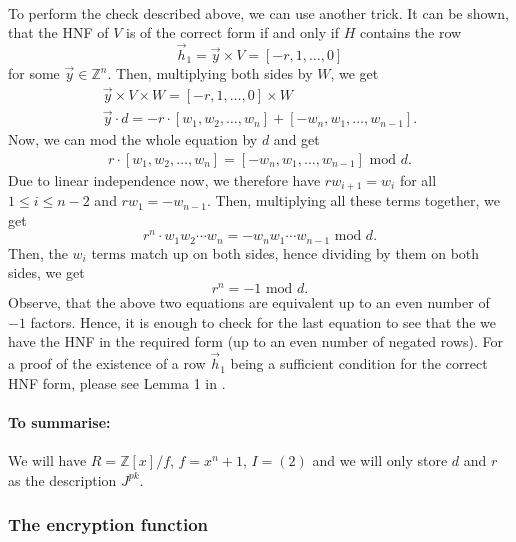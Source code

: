 \documentclass{article}
\theoremstyle{definition}
\theoremstyle{example}
\newcommand{\Int}{\mathbb{Z}}
\renewcommand{\mod}{\,\,\text{mod}\,\,}
\begin{document}
\paragraph{} To perform the check described above, we can use another trick. It
can be shown, that the HNF of $V$ is of the correct form if and only if $H$
contains the row 
\[
  \vec{h}_1 = \vec{y} \times V = [-r, 1, \hdots, 0]
\]
for some $\vec{y} \in \Int^n$. Then, multiplying both sides by $W$, we get
\begin{gather*}
  \vec{y} \times V \times W = [-r, 1, \hdots, 0] \times W \\
  \vec{y} \cdot d = -r \cdot [w_1, w_2, \hdots, w_n] + [-w_n, w_1, \hdots, w_{n-1}]. 
\end{gather*}
Now, we can mod the whole equation by $d$ and get
\begin{gather*}
  r \cdot [w_1, w_2, \hdots, w_n] = [-w_n, w_1, \hdots, w_{n-1}] \mod d.
\end{gather*}
Due to linear independence now, we therefore have $rw_{i+1} = w_i$ for all $1
\leq i \leq n - 2$ and $rw_1 = -w_{n - 1}$. Then, multiplying all these terms
together, we get
\[
  r^n\cdot w_1w_2\cdots w_n = -w_nw_1\cdots w_{n-1} \mod d.
\]
Then, the $w_i$ terms match up on both sides, hence dividing by them on both
sides, we get
\[
  r^n = -1 \mod d.
\]
Observe, that the above two equations are equivalent up to an even number of
$-1$ factors. Hence, it is enough to check for the last equation to see that the
we have the HNF in the required form (up to an even number of negated rows). For
a proof of the existence of a row $\vec{h}_1$ being a sufficient condition for
the correct HNF form, please see Lemma 1 in \cite{gentryImplementation}.
\paragraph{To summarise:} We will have $R = \Int[x]/f$, $f = x^n + 1$, $I =
(2)$ and we will only store $d$ and $r$ as the description $J^{pk}$.
\subsubsection{The encryption function}
\end{document}
